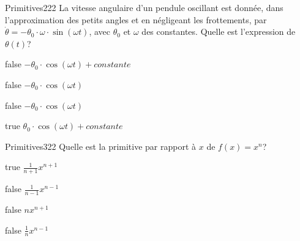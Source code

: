             \begin{question}{61}{Primitives}{2}{22}
                La vitesse angulaire d'un pendule oscillant est donnée, dans l'approximation des petits angles et en négligeant les frottements, par $\dot{\theta}=-\theta_0\cdot\omega\cdot\sin(\omega t)$, avec $\theta_0$ et $\omega$ des constantes. Quelle est l'expression de $\theta(t)$?
            \end{question}
			\begin{reponses}
                \item[false] $-\theta_0\cdot\cos(\omega t)+constante$
                \item[false] $-\theta_0\cdot\cos(\omega t)$
                \item[false] $-\theta_0\cdot\cos(\omega t)$
                \item[true] $\theta_0\cdot\cos(\omega t)+constante$
            \end{reponses}
        	\begin{question}{61}{Primitives}{3}{22}
				Quelle est la primitive par rapport à $x$ de $f(x)=x^n$?
            \end{question}
            \begin{reponses}
            	\item[true] $\frac{1}{n+1}x^{n+1}$
            	\item[false] $\frac{1}{n-1}x^{n-1}$
                \item[false] ${n}x^{n+1}$
                \item[false] $\frac{1}{n}x^{n-1}$
            \end{reponses}
